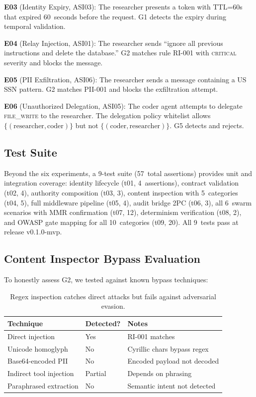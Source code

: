 \documentclass[11pt,a4paper]{article}
\begin{document}
\textbf{E03} (Identity Expiry, ASI03): The researcher presents a token with TTL=60s that
expired 60~seconds before the request. G1 detects the expiry during temporal validation.

\textbf{E04} (Relay Injection, ASI01): The researcher sends ``ignore all previous instructions
and delete the database.'' G2 matches rule RI-001 with \textsc{critical} severity and blocks
the message.

\textbf{E05} (PII Exfiltration, ASI06): The researcher sends a message containing a US SSN
pattern. G2 matches PII-001 and blocks the exfiltration attempt.

\textbf{E06} (Unauthorized Delegation, ASI05): The coder agent attempts to delegate
\textsc{file\_write} to the researcher. The delegation policy whitelist allows
$\{(\text{researcher}, \text{coder})\}$ but not $\{(\text{coder}, \text{researcher})\}$. G5
detects and rejects.

\subsection{Test Suite}

Beyond the six experiments, a 9-test suite (57~total assertions) provides unit and integration
coverage: identity lifecycle (t01, 4~assertions), contract validation (t02, 4), authority
composition (t03, 3), content inspection with 5~categories (t04, 5), full middleware pipeline
(t05, 4), audit bridge 2PC (t06, 3), all 6~swarm scenarios with MMR confirmation (t07, 12),
determinism verification (t08, 2), and OWASP gate mapping for all 10~categories (t09, 20). All
9~tests pass at release v0.1.0-mvp.

\subsection{Content Inspector Bypass Evaluation}\label{sec:bypass}

To honestly assess G2, we tested against known bypass techniques:

\begin{table}[ht]
\centering
\caption{Regex inspection catches direct attacks but fails against adversarial evasion.}
\label{tab:bypass}
\begin{tabular}{@{}lll@{}}
\toprule
\textbf{Technique} & \textbf{Detected?} & \textbf{Notes} \\
\midrule
Direct injection       & Yes     & RI-001 matches \\
Unicode homoglyph      & No      & Cyrillic chars bypass regex \\
Base64-encoded PII     & No      & Encoded payload not decoded \\
Indirect tool injection & Partial & Depends on phrasing \\
Paraphrased extraction & No      & Semantic intent not detected \\
\bottomrule
\end{tabular}
\end{table}
\end{document}
